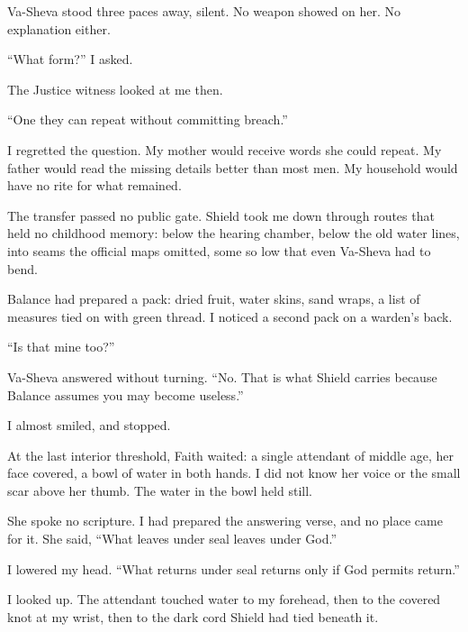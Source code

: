 Va-Sheva stood three paces away, silent. No weapon showed on her. No explanation either.\par

``What form?'' I asked.\par

The Justice witness looked at me then.\par

``One they can repeat without committing breach.''\par

I regretted the question. My mother would receive words she could repeat. My father would read the missing details better than most men. My household would have no rite for what remained.\par

The transfer passed no public gate. Shield took me down through routes that held no childhood memory: below the hearing chamber, below the old water lines, into seams the official maps omitted, some so low that even Va-Sheva had to bend.\par

Balance had prepared a pack: dried fruit, water skins, sand wraps, a list of measures tied on with green thread. I noticed a second pack on a warden's back.\par

``Is that mine too?''\par

Va-Sheva answered without turning. ``No. That is what Shield carries because Balance assumes you may become useless.''\par

I almost smiled, and stopped.\par

At the last interior threshold, Faith waited: a single attendant of middle age, her face covered, a bowl of water in both hands. I did not know her voice or the small scar above her thumb. The water in the bowl held still.\par

She spoke no scripture. I had prepared the answering verse, and no place came for it. She said, ``What leaves under seal leaves under God.''\par

I lowered my head. ``What returns under seal returns only if God permits return.''\par

I looked up. The attendant touched water to my forehead, then to the covered knot at my wrist, then to the dark cord Shield had tied beneath it.\par

